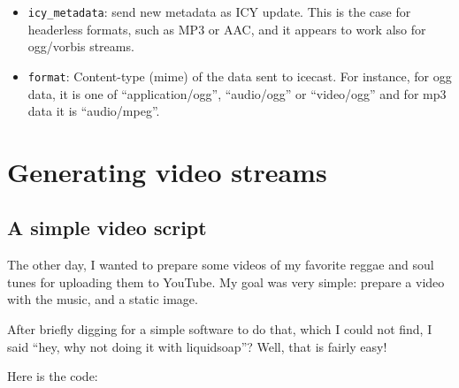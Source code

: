 \documentclass{book}
\begin{document}
\begin{itemize}
\item \verb+icy_metadata+: send new metadata as ICY update. This is the case for headerless formats, such as MP3 or AAC, and it appears to work also for ogg/vorbis streams.
\item \verb+format+: Content-type (mime) of the data sent to icecast. For instance, for ogg data, it is one of ``application/ogg'', ``audio/ogg'' or ``video/ogg'' and for mp3 data it is ``audio/mpeg''.

\end{itemize}

\chapter{Generating video streams}
\section{A simple video script}
The other day, I wanted to prepare some videos of my favorite reggae and soul
tunes for uploading them to YouTube.  My goal was very simple: prepare a video
with the music, and a static image.

After briefly digging for a simple software to do that, which I could not find,
I said ``hey, why not doing it with liquidsoap''?  Well, that is fairly easy!

Here is the code:





\end{document}
